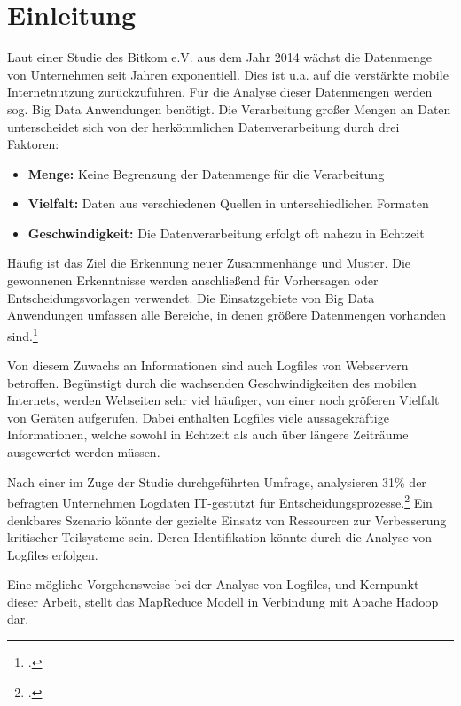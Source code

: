 
\chapter{Einleitung}\label{cha:Einleitung}
Laut einer Studie des Bitkom e.V. aus dem Jahr 2014 wächst die Datenmenge von Unternehmen seit Jahren exponentiell. Dies ist u.a. auf die verstärkte mobile Internetnutzung zurückzuführen. Für die Analyse dieser Datenmengen werden sog. Big Data Anwendungen benötigt. Die Verarbeitung großer Mengen an Daten unterscheidet sich von der herkömmlichen Datenverarbeitung durch drei Faktoren:

\begin{itemize}
	\item \textbf{Menge:} Keine Begrenzung der Datenmenge für die Verarbeitung
	\item \textbf{Vielfalt:} Daten aus verschiedenen Quellen in unterschiedlichen Formaten
	\item \textbf{Geschwindigkeit:} Die Datenverarbeitung erfolgt oft nahezu in Echtzeit
\end{itemize}

Häufig ist das Ziel die Erkennung neuer Zusammenhänge und Muster. Die gewonnenen Erkenntnisse werden anschließend für Vorhersagen oder Entscheidungsvorlagen verwendet. Die Einsatzgebiete von Big Data Anwendungen umfassen alle Bereiche, in denen größere Datenmengen vorhanden sind.\footcite[Vgl.][S. 3]{Bitkom.2014}

Von diesem Zuwachs an Informationen sind auch Logfiles von Webservern betroffen. Begünstigt durch die wachsenden Geschwindigkeiten des mobilen Internets, werden Webseiten sehr viel häufiger, von einer noch größeren Vielfalt von Geräten aufgerufen. Dabei enthalten Logfiles viele aussagekräftige Informationen, welche sowohl in Echtzeit als auch über längere Zeiträume ausgewertet werden müssen.

Nach einer im Zuge der Studie durchgeführten Umfrage, analysieren 31\% der befragten Unternehmen Logdaten IT-gestützt für Entscheidungsprozesse.\footcite[Vgl.][S. 8]{Bitkom.2014} Ein denkbares Szenario könnte der gezielte Einsatz von Ressourcen zur Verbesserung kritischer Teilsysteme sein. Deren Identifikation könnte durch die Analyse von Logfiles erfolgen.

Eine mögliche Vorgehensweise bei der Analyse von Logfiles, und Kernpunkt dieser Arbeit, stellt das MapReduce Modell in Verbindung mit Apache Hadoop dar.

